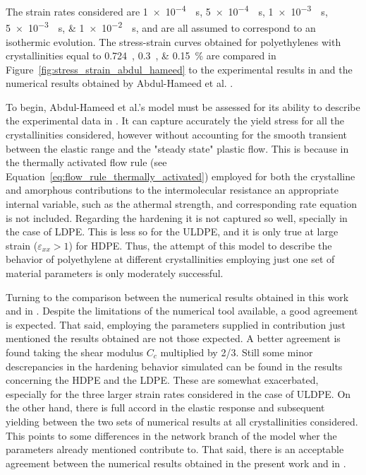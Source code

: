 The strain rates considered are \SIlist{1e-4;5e-4;1e-3;5e-3;1e-2}{\per\second}, and are all assumed to correspond to an isothermic evolution.
The stress-strain curves obtained for polyethylenes with crystallinities equal to \SIlist{0.724;0.3;0.15}{}\% are compared in Figure~\ref{fig:stress_strain_abdul_hameed} to the experimental results in \cite{ayoubEffectsCrystalContent2011} and the numerical results obtained by Abdul-Hameed et al. \citep{abdul-hameedTwophaseHyperelasticviscoplasticConstitutive2014}.

To begin, Abdul-Hameed et al.'s model \citep{abdul-hameedTwophaseHyperelasticviscoplasticConstitutive2014} must be assessed for its ability to describe the experimental data in \cite{ayoubEffectsCrystalContent2011}.
It can capture accurately the yield stress for all the crystallinities considered, however without accounting for the smooth transient between the elastic range and the "steady state" plastic flow.
This is because in the thermally activated flow rule (see Equation~\eqref{eq:flow_rule_thermally_activated}) employed for both the crystalline and amorphous contributions to the intermolecular resistance an appropriate internal variable, such as the athermal strength, and corresponding rate equation is not included.
Regarding the hardening it is not captured so well, specially in the case of LDPE.
This is less so for the ULDPE, and it is only true at large strain ($\varepsilon_{xx}>1$) for HDPE.
Thus, the attempt of this model to describe the behavior of polyethylene at different crystallinities employing just one set of material parameters is only moderately successful.

Turning to the comparison between the numerical results obtained in this work and in \cite{abdul-hameedTwophaseHyperelasticviscoplasticConstitutive2014}.
Despite the limitations of the numerical tool available, a good agreement is expected.
That said, employing the parameters supplied in contribution just mentioned the results obtained are not those expected.
A better agreement is found taking the shear modulus $C_c$ multiplied by 2/3.
Still some minor descrepancies in the hardening behavior simulated can be found in the results concerning the HDPE and the LDPE.
These are somewhat exacerbated, especially for the three larger strain rates considered in the case of ULDPE.
On the other hand, there is full accord in the elastic response and subsequent yielding between the two sets of numerical results at all crystallinities considered.
This points to some differences in the network branch of the model wher the parameters already mentioned contribute to.
That said, there is an acceptable agreement between the numerical results obtained in the present work and in \cite{abdul-hameedTwophaseHyperelasticviscoplasticConstitutive2014}.

